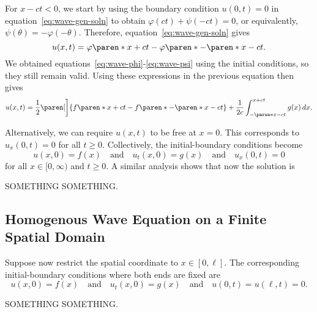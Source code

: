 \documentclass[11pt]{penrose}
\begin{document}
For $x - ct < 0$, we start by using the boundary condition $u(0, t) = 0$ in equation~\eqref{eq:wave-gen-soln} to obtain $\varphi(ct) + \psi(-ct) = 0$, or equivalently, $\psi(\theta) = - \varphi(-\theta)$. Therefore, equation~\eqref{eq:wave-gen-soln} gives
\begin{equation}
    u(x, t) = \varphi\paren*{x + ct} - \varphi\paren*{-\paren*{x - ct}}.
\end{equation}
We obtained equations~\eqref{eq:wave-phi}-\eqref{eq:wave-psi} using the initial conditions, so they still remain valid. Using these expressions in the previous equation then gives
\begin{equation}
    u(x, t)
    = \frac{1}{2} \paren[\bigg]{f\paren*{x + ct} - f\paren*{-\paren*{x - ct}}}
    + \frac{1}{2c} \int_{-\paren*{x - ct}}^{x + ct} g(x) \,dx.
    \label{eq:wave-soln-semiinfinite}
\end{equation}

Alternatively, we can require $u(x,t)$ to be free at $x=0$. This corresponds to $u_x(0,t) = 0$ for all $t \geq 0$. Collectively, the initial-boundary conditions become
\begin{equation}
    u(x, 0) = f(x)
    \quad\text{and}\quad
    u_t (x, 0) = g(x)
    \quad\text{and}\quad
    u_x (0, t) = 0
\end{equation}
for all $x \in [0, \infty)$ and $t \geq 0$. A similar analysis shows that now the solution is

SOMETHING SOMETHING.

\subsection{Homogenous Wave Equation on a Finite Spatial Domain}
Suppose now restrict the spatial coordinate to $x \in [0, \ell]$. The corresponding initial-boundary conditions where both ends are fixed are
\begin{equation}
    u(x, 0) = f(x)
    \quad\text{and}\quad
    u_t (x, 0) = g(x)
    \quad\text{and}\quad
    u(0, t) = u(\ell, t) = 0.
    \label{eq:wave-initial-finite}
\end{equation}

SOMETHING SOMETHING.
\end{document}
